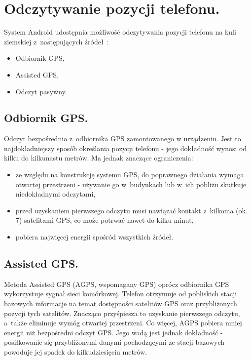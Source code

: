 \documentclass[a4paper,twocolumn,11pt]{article}
\begin{document}

\section{Odczytywanie pozycji telefonu.} \label{sec:position_tracking}

System Android udostępnia możliwość odczytywania pozycji telefonu na kuli ziemskiej z~następujących źródeł~\cite{and:loc}:

\begin{itemize}
 \item Odbiornik GPS,
 \item Assisted GPS,
 \item Odczyt pasywny.
\end{itemize}


\subsection{Odbiornik GPS.}
 Odczyt bezpośrednio z~odbiornika GPS zamontowanego w urządzeniu.
 Jest to najdokładniejszy sposób określania pozycji telefonu - jego dokładność wynosi od kilku do kilkunastu metrów.
 Ma jednak znaczące ograniczenia:
 \begin{itemize}
  \item ze względu na konstrukcję systemu GPS, do poprawnego działania wymaga otwartej przestrzeni - używanie go w~budynkach lub w~ich pobliżu skutkuje niedokładnymi odczytami,
  \item przed uzyskaniem pierwszego odczytu musi nawiązać kontakt z~kilkoma (ok. 7) satelitami GPS, co może potrwać nawet do kilku minut,
  \item pobiera najwięcej energii spośród wszystkich źródeł.
 \end{itemize}


\subsection{Assisted GPS.}
 Metoda Assisted GPS (AGPS, wspomagany GPS) oprócz odbiornika GPS wykorzystuje sygnał sieci komórkowej.
 Telefon otrzymuje od pobliskich stacji bazowych informacje na temat dostępności satelitów GPS oraz przybliżonych pozycji tych satelitów.
 Znacząco przyśpiesza to uzyskanie pierwszego odczytu, a~także eliminuje wymóg otwartej przestrzeni.
 Co więcej, AGPS pobiera mniej energii niż bezpośredni odczyt GPS.
 Jego wadą jest jednak dokładność - posiłkowanie się przybliżonymi danymi pochodzącymi ze stacji bazowych powoduje jej spadek do kilkudziesięciu metrów.
\end{document}
